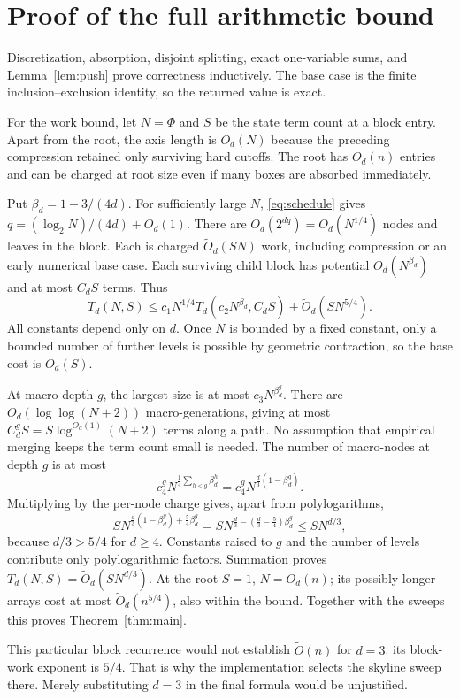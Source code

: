 \documentclass[12pt,a4paper]{article}
\newcommand{\wtO}{\widetilde O}
\newcommand{\1}{\mathbf1}
\begin{document}
\section{Proof of the full arithmetic bound}
Discretization, absorption, disjoint splitting, exact one-variable sums,
and Lemma~\ref{lem:push} prove correctness inductively. The base case is
the finite inclusion--exclusion identity, so the returned value is exact.

For the work bound, let $N=\Phi$ and $S$ be the state term count at a
block entry. Apart from the root, the axis length is $O_d(N)$ because
the preceding compression retained only surviving hard cutoffs. The root
has $O_d(n)$ entries and can be charged at root size even if many boxes
are absorbed immediately.

Put $\beta_d=1-3/(4d)$. For sufficiently large $N$,
\eqref{eq:schedule} gives $q=(\log_2N)/(4d)+O_d(1)$.
There are $O_d(2^{dq})=O_d(N^{1/4})$ nodes and leaves in the block.
Each is charged $\wtO_d(SN)$ work, including compression or an early
numerical base case. Each surviving child block has potential
$O_d(N^{\beta_d})$ and at most $C_dS$ terms. Thus
\begin{equation}
T_d(N,S)\le c_1N^{1/4}T_d(c_2N^{\beta_d},C_dS)
                         +\wtO_d(SN^{5/4}).        \label{eq:recurrence}
\end{equation}
All constants depend only on $d$. Once $N$ is bounded by a fixed constant,
only a bounded number of further levels is possible by geometric
contraction, so the base cost is $O_d(S)$.

At macro-depth $g$, the largest size is at most $c_3N^{\beta_d^g}$.
There are $O_d(\log\log(N+2))$ macro-generations, giving at most
$C_d^gS=S\log^{O_d(1)}(N+2)$ terms along a path.
No assumption that empirical merging keeps the term count small is needed.
The number of macro-nodes at depth $g$ is at most
\[
c_4^gN^{\frac14\sum_{h<g}\beta_d^h}
       =c_4^gN^{\frac d3(1-\beta_d^g)}.
\]
Multiplying by the per-node charge gives, apart from polylogarithms,
\[
 S N^{\frac d3(1-\beta_d^g)+\frac54\beta_d^g}
 =S N^{\frac d3-(\frac d3-\frac54)\beta_d^g}
 \le S N^{d/3},
\]
because $d/3>5/4$ for $d\ge4$. Constants raised to $g$ and the number
of levels contribute only polylogarithmic factors. Summation proves
$T_d(N,S)=\wtO_d(SN^{d/3})$. At the root $S=1$, $N=O_d(n)$; its
possibly longer arrays cost at most $\wtO_d(n^{5/4})$, also within the
bound. Together with the sweeps this proves Theorem~\ref{thm:main}.

This particular block recurrence would not establish $\wtO(n)$ for
$d=3$: its block-work exponent is $5/4$. That is why the implementation
selects the skyline sweep there. Merely substituting $d=3$ in the final
formula would be unjustified.
\end{document}
